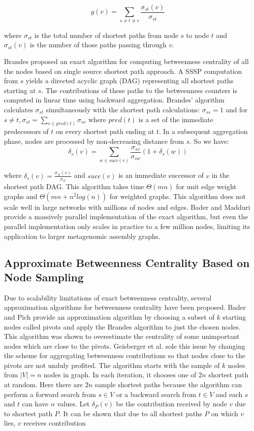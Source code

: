 \documentclass[runningheads,a4paper]{llncs}
\begin{document}
$$g(v) = \sum_{s \neq t \neq v} \frac{\sigma_{st}(v)}{\sigma_{st}}$$

where $\sigma_{st}$ is the total number of shortest paths from node $s$ to node $t$ and $\sigma_{st}(v)$ is the number of those paths passing through $v$.

Brandes\cite{brandes} proposed an exact algorithm for computing betweenness centrality of all the nodes based on single source shortest path approach. A SSSP computation from $s$ yields a directed acyclic graph (DAG) representing all shortest paths starting at $s$. The contributions of these paths to the betweenness counters is computed in linear time using backward aggregation. Brandes' algorithm calculates $\sigma_{st}$  simultaneously with the shortest path calculations: $\sigma_{ss} = 1$ and for $s \neq t, \sigma_{st} = \sum_{v \in pred(t)} \sigma_{sv}$ where $pred(t)$ is a set of the immediate predecessors of  $t$ on every shortest path ending at $t$. In a subsequent aggregation phase, nodes are processed by non-decreasing distance from $s$. So we have: 
$$\delta_{s}(v) = \sum_{w \in succ(v)} \frac{\sigma_{sv}}{\sigma_{sw}}(1+\delta_{s}(w))$$

where $\delta_{s}(v) = \frac{\sigma_{st}(v)}{\sigma_{st}}$ and $succ(v)$ is an immediate successor of $v$  in the shortest path DAG.   
This algorithm takes time $\Theta(mn)$ for unit edge weight graphs and $\Theta(mn + n^{2}log(n))$ for weighted graphs. This algorithm does not scale well in large networks with millions of nodes and edges. Bader and Madduri\cite{bader} provide a massively parallel implementation of the exact algorithm, but even the parallel implementation only scales in practice to  a few million nodes, limiting its application to larger metagenomic assembly graphs.

\subsection*{Approximate Betweenness Centrality Based on Node Sampling}
Due to scalability limitations of exact betweenness centrality, several approximation algorithms for betweenness centrality have been proposed. Bader and Pich\cite{bp} provide an approximation algorithm by choosing a subset of $k$ starting nodes called pivots and apply the Brandes algorithm to just the chosen nodes. This algorithm was shown to overestimate the centrality of some unimportant nodes which are close to the pivots. Geisberger et al. \cite{sanders} sole this issue by changing the scheme for aggregating betweenness contributions so that nodes close to the pivots are not unduly profited. The algorithm starts with the sample of $k$ nodes from $|V| = n$ nodes in graph. In each iteration, it chooses one of $2n$ shortest path at random. Here there are $2n$ sample shortest paths because the algorithm can perform a forward search from $s \in V$ or a backward search from $t \in V$ and each $s$ and $t$ can have $n$ values. Let $\delta_{P}(v)$ be the contribution received by node $v$ due to shortest path $P$. It can be shown that \cite{sanders} due to all shortest paths $P$ on which $v$ lies, $v$ receives contribution 
\end{document}
